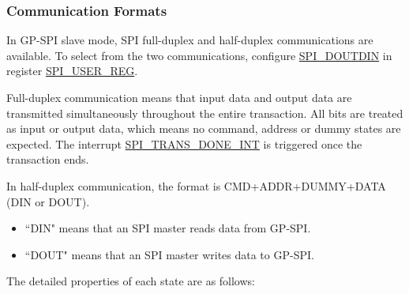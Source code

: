 \documentclass[main\_\_EN.tex]{subfiles}
\begin{document}
\subsubsection{Communication Formats}\label{slave communication format}

In GP-SPI slave mode, SPI full-duplex and half-duplex communications are available. To select from the two communications, configure \hyperref[fielddesc:SPIDOUTDIN]{SPI\_DOUTDIN} in register \hyperref[regdesc:SPIUSERREG]{SPI\_USER\_REG}.

Full-duplex communication means that input data and output data are transmitted simultaneously throughout the entire transaction. All bits are treated as input or output data, which means no command, address or dummy states are expected. The interrupt \hyperref[int:SPITRANSDONEINT]{SPI\_TRANS\_DONE\_INT} is triggered once the transaction ends.

In half-duplex communication, the format is CMD+ADDR+DUMMY+DATA (DIN or DOUT).
\begin{itemize}
    \item ``DIN" means that an SPI master reads data from GP-SPI.
    \item ``DOUT" means that an SPI master writes data to GP-SPI.
\end{itemize}

The detailed properties of each state are as follows:
\end{document}
